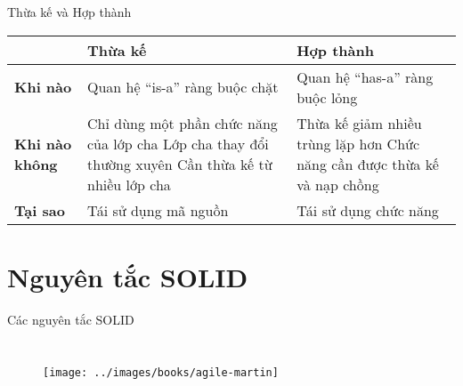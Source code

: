 \documentclass{beamer}
\begin{document}
\begin{frame}{Thừa kế và Hợp thành}
\begin{table}
    \centering
    \begin{tabular}{|p{2cm}|p{3.5cm}|p{3.5cm}|}
        \hline
        & \textbf{Thừa kế} & \textbf{Hợp thành} \\
        \hline
        \textbf{Khi nào} & Quan hệ ``is-a'' \newline ràng buộc chặt 
        & Quan hệ ``has-a'' \newline ràng buộc lỏng\\
        \hline
        \textbf{Khi nào không} &
            Chỉ dùng một phần chức năng của lớp cha\newline
            Lớp cha thay đổi thường xuyên\newline
            Cần thừa kế từ nhiều lớp cha
        &  Thừa kế giảm nhiều trùng lặp hơn \newline
        Chức năng cần được thừa kế và nạp chồng \\
        \hline
        \textbf{Tại sao} & Tái sử dụng mã nguồn & Tái sử dụng chức năng \\
        \hline
    \end{tabular}
\end{table}

\end{frame}

\section{Nguyên tắc SOLID}

\begin{frame}{Các nguyên tắc SOLID}
    \begin{columns}
        \begin{figure}
            \centering
            \texttt{[image: ../images/books/agile-martin]}
        \end{figure}
    \end{columns}
\end{frame}
\end{document}
